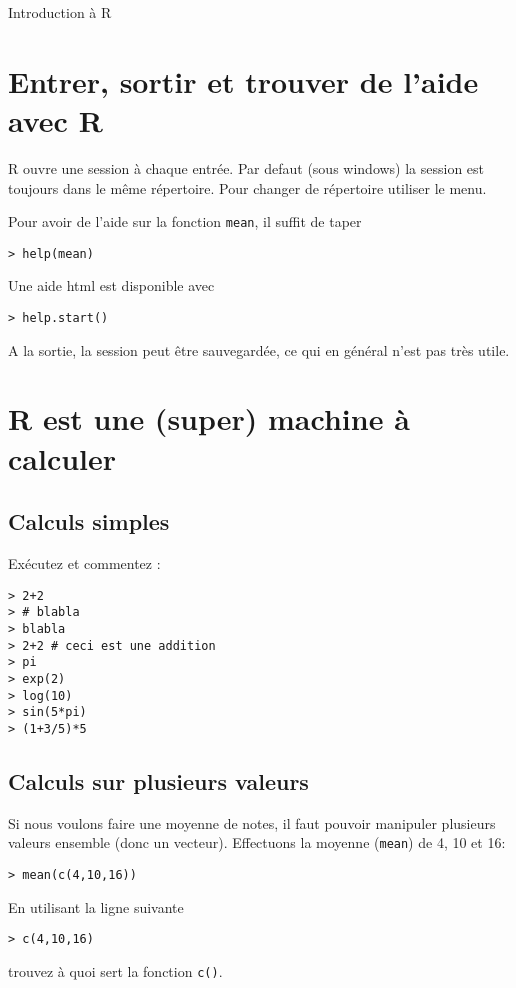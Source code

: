 \documentclass[a4paper,10pt,french]{article}
\newcommand{\code}[1]{\texttt{#1}}
\begin{document}
\thispagestyle{empty}

\hspace*{-0.5cm}

\begin{center}
\LARGE Introduction à \textsf{R}
\end{center}
\bigskip

\section{Entrer, sortir et trouver de l'aide avec \textsf{R}}
\textsf{R} ouvre une session à chaque entrée. Par defaut (sous windows)
la session est toujours dans le même répertoire. Pour changer de
répertoire utiliser le menu.

Pour avoir de l'aide sur la fonction \texttt{mean}, il suffit de taper
\begin{verbatim}
> help(mean)
\end{verbatim}

Une aide html est disponible avec 
\begin{verbatim}
> help.start()
\end{verbatim}

A la sortie, la session peut être sauvegardée, ce qui en général n'est
pas très utile.
\section{\textsf{R} est une (super) machine à calculer}
\subsection{Calculs simples}
Exécutez et commentez :
\begin{verbatim}
> 2+2
> # blabla
> blabla
> 2+2 # ceci est une addition
> pi 
> exp(2)
> log(10)
> sin(5*pi)
> (1+3/5)*5
\end{verbatim}
\subsection{Calculs sur plusieurs valeurs}
Si nous voulons faire une moyenne de notes, il faut pouvoir manipuler
plusieurs valeurs ensemble (donc un vecteur). Effectuons la moyenne
(\texttt{mean}) de 4, 10 et 16:
\begin{verbatim}
> mean(c(4,10,16))
\end{verbatim}
En utilisant la ligne suivante
\begin{verbatim}
> c(4,10,16)
\end{verbatim}
trouvez à quoi sert la fonction \code{c()}.
\end{document}
